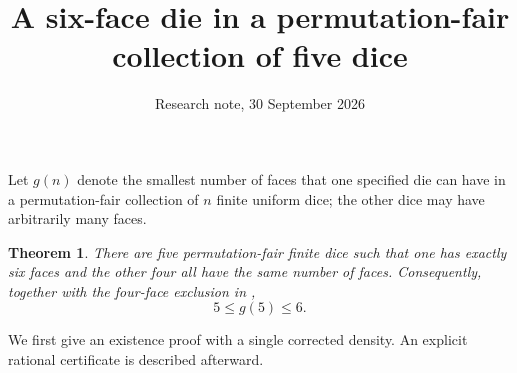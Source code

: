 \documentclass[11pt]{article}
\title{A six-face die in a permutation-fair collection of five dice}
\author{Research note, 30 September 2026}
\date{}
\newtheorem{theorem}{Theorem}
\begin{document}
\maketitle

Let $g(n)$ denote the smallest number of faces that one specified die can
have in a permutation-fair collection of $n$ finite uniform dice; the
other dice may have arbitrarily many faces.

\begin{theorem}
There are five permutation-fair finite dice such that one has exactly
six faces and the other four all have the same number of faces.
Consequently, together with the four-face exclusion in
,
\[
 5\le g(5)\le6.
\]
\end{theorem}

We first give an existence proof with a single corrected density.
An explicit rational certificate is described afterward.
\end{document}
